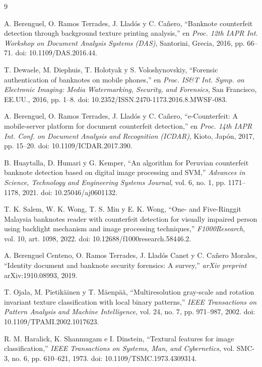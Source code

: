 \documentclass[conference]{IEEEtran}
\begin{document}
\begin{thebibliography}{9}

A. Berenguel, O. Ramos Terrades, J. Lladós y C. Cañero,
``Banknote counterfeit detection through background texture printing
analysis,'' en \textit{Proc. 12th IAPR Int. Workshop on Document
Analysis Systems (DAS)}, Santorini, Grecia, 2016, pp. 66--71.
doi: 10.1109/DAS.2016.44.

T. Dewaele, M. Diephuis, T. Holotyak y S. Voloshynovskiy,
``Forensic authentication of banknotes on mobile phones,'' en
\textit{Proc. IS\&T Int. Symp. on Electronic Imaging: Media
Watermarking, Security, and Forensics}, San Francisco, EE.UU., 2016,
pp. 1--8. doi: 10.2352/ISSN.2470-1173.2016.8.MWSF-083.

A. Berenguel, O. Ramos Terrades, J. Lladós y C. Cañero,
``e-Counterfeit: A mobile-server platform for document counterfeit
detection,'' en \textit{Proc. 14th IAPR Int. Conf. on Document Analysis
and Recognition (ICDAR)}, Kioto, Japón, 2017, pp. 15--20.
doi: 10.1109/ICDAR.2017.390.

B. Huaytalla, D. Humari y G. Kemper,
``An algorithm for Peruvian counterfeit banknote detection based on
digital image processing and SVM,''
\textit{Advances in Science, Technology and Engineering Systems
Journal}, vol. 6, no. 1, pp. 1171--1178, 2021.
doi: 10.25046/aj0601132.

T. K. Salem, W. K. Wong, T. S. Min y E. K. Wong,
``One- and Five-Ringgit Malaysia banknotes reader with counterfeit
detection for visually impaired person using backlight mechanism and
image processing techniques,''
\textit{F1000Research}, vol. 10, art. 1098, 2022.
doi: 10.12688/f1000research.58446.2.

A. Berenguel Centeno, O. Ramos Terrades, J. Lladós Canet y
C. Cañero Morales,
``Identity document and banknote security forensics: A survey,''
\textit{arXiv preprint} arXiv:1910.08993, 2019.

T. Ojala, M. Pietikäinen y T. Mäenpää,
``Multiresolution gray-scale and rotation invariant texture
classification with local binary patterns,''
\textit{IEEE Transactions on Pattern Analysis and Machine
Intelligence}, vol. 24, no. 7, pp. 971--987, 2002.
doi: 10.1109/TPAMI.2002.1017623.

R. M. Haralick, K. Shanmugam e I. Dinstein,
``Textural features for image classification,''
\textit{IEEE Transactions on Systems, Man, and Cybernetics},
vol. SMC-3, no. 6, pp. 610--621, 1973.
doi: 10.1109/TSMC.1973.4309314.


\end{thebibliography}
\end{document}
